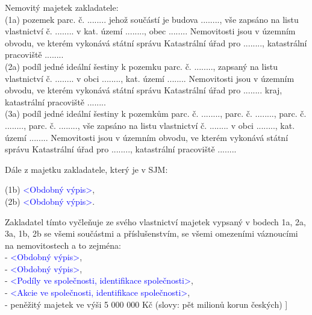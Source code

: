 \documentclass[parskip=half]{scrreprt}
\begin{document}
\begin{contract}
Nemovitý majetek zakladatele: \\
(1a) pozemek parc. č. ........ jehož součástí je budova ........, vše zapsáno na listu vlastnictví č. ........ v kat. území ........, obec ........ Nemovitosti jsou v územním obvodu, ve kterém vykonává státní správu Katastrální úřad pro ........, katastrální pracoviště ........\\
(2a) podíl jedné ideální šestiny k pozemku parc. č. ........, zapsaný na listu vlastnictví č. ........ v obci ........, kat. území ........ Nemovitosti jsou v územním obvodu, ve kterém vykonává státní správu Katastrální úřad pro ........ kraj, katastrální pracoviště ........\\
(3a) podíl jedné ideální šestiny k pozemkům parc. č. ........, parc. č. ........, parc. č. ........, parc. č. ........, vše zapsáno na listu vlastnictví č. ........ v obci ........, kat. území ........ Nemovitosti jsou v územním obvodu, ve kterém vykonává státní správu Katastrální úřad pro ........, katastrální pracoviště ........

Dále z majetku zakladatele, který je v SJM:

(1b) \textcolor{blue}{<Obdobný výpis>},\\
(2b) \textcolor{blue}{<Obdobný výpis>}.

Zakladatel tímto vyčleňuje ze svého vlastnictví majetek vypsaný v bodech 1a, 2a, 3a, 1b, 2b se všemi součástmi a příslušenstvím, se všemi omezeními váznoucími na nemovitostech a to zejména: \\
- \textcolor{blue}{<Obdobný výpis>},\\
- \textcolor{blue}{<Obdobný výpis>},\\
- \textcolor{blue}{<Podíly ve společnosti, identifikace společnosti>},\\
- \textcolor{blue}{<Akcie ve společnosti, identifikace společnosti>},\\
- peněžitý majetek ve výši 5 000 000 Kč (slovy: pět milionů korun českých)
]
\parnumbertrue



\end{contract}
\end{document}
